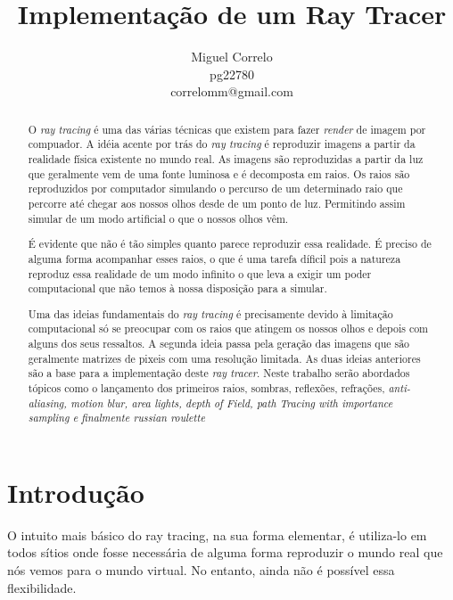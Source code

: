 \documentclass[12pt]{article}
\title{Implementação de um Ray Tracer}
\author{Miguel Correlo \\
\small{pg22780}\\
\small{correlomm@gmail.com}}
\begin{document}
\maketitle

\begin{abstract}
O {\it ray tracing} é uma das várias técnicas que existem para fazer {\it render} de imagem por compuador. A idéia acente por trás do {\it ray tracing} é reproduzir imagens a partir da realidade física existente no mundo real. As imagens são reproduzidas a partir da luz que geralmente vem de uma fonte luminosa e é decomposta em raios. Os raios são reproduzidos por computador simulando o percurso de um determinado raio que percorre até chegar aos nossos olhos desde de um ponto de luz. Permitindo assim simular de um modo artificial o que o nossos olhos vêm.\newline

É evidente que não é tão simples quanto parece reproduzir essa realidade. É preciso de alguma forma acompanhar esses raios, o que é uma tarefa díficil pois a natureza reproduz essa realidade de um modo infinito o que leva a exigir um poder computacional que não temos à nossa disposição para a simular.\newline

Uma das ideias fundamentais do {\it ray tracing} é precisamente devido à limitação computacional só se preocupar com os raios que atingem os nossos olhos e depois com alguns dos seus ressaltos. A segunda ideia passa pela geração das imagens que são geralmente matrizes de pixeis com uma resolução limitada. As duas ideias anteriores são a base para a implementação deste {\it ray tracer}. Neste trabalho serão abordados tópicos como o lançamento dos primeiros raios, sombras, reflexões, refrações, {\it anti-aliasing, motion blur, area lights, depth of Field, path Tracing with importance sampling e finalmente russian roulette}


\end{abstract}

\section{Introdução}
\vspace{10 mm}
\hspace{8 mm} O intuito mais básico do ray tracing, na sua forma elementar, é utiliza-lo em todos sítios onde fosse necessária de alguma forma reproduzir o mundo real que nós vemos para o mundo virtual. No entanto, ainda não é possível essa flexibilidade.\newline
\end{document}
